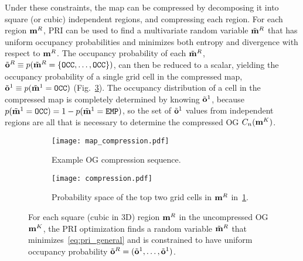 Under these constraints, the map can be compressed by decomposing it into
square (or cubic) independent regions, and compressing each region.
For each region $\mathbf{m}^{R}$, PRI can be used to find a multivariate random
variable $\tilde{\mathbf{m}}^{R}$ that has uniform occupancy probabilities and
minimizes both entropy and divergence with respect to $\mathbf{m}^{R}$.
The occupancy probability of each $\tilde{\mathbf{m}}^{R}$,
$\tilde{\mathbf{o}}^{R} \equiv
p(\tilde{\mathbf{m}}^{R}=\{\texttt{OCC},\dots,\texttt{OCC}\})$, can then be reduced
to a scalar, yielding the occupancy probability of a single grid cell in the
compressed map, $\tilde{\mathbf{o}}^{1}\equiv
p(\tilde{\mathbf{m}}^{1}=\texttt{OCC})$ (Fig.~\ref{fig:pri_compression}).
The occupancy distribution of a cell in the compressed map is completely determined by knowing
$\tilde{\mathbf{o}}^{1}$, because $p(\tilde{\mathbf{m}}^{1}=\texttt{OCC}) = 1 -
p(\tilde{\mathbf{m}}^{1} =
\texttt{EMP})$, so the set of $\tilde{\mathbf{o}}^{1}$ values from independent
regions are all that is necessary to determine the compressed OG $C_{n}(\mathbf{m}^{K})$.

\begin{figure}
  \centering
    \begin{subfigure}[t]{0.45\textwidth}
        \centering
        \texttt{[image: map\_compression.pdf]}
        \caption{Example OG compression sequence. \label{fig:pri_compression1}}
    \end{subfigure}
    \hfill
    \begin{subfigure}[t]{0.45\textwidth}
        \centering
        \texttt{[image: compression.pdf]}
        \caption{Probability space of the top two grid cells
        in $\mathbf{m}^{R}$ in~\ref{fig:pri_compression1}. \label{fig:pri_compression2}}
    \end{subfigure}
    \caption[Occupancy grid compression sequence.]{For each square (cubic in 3D)
      region $\mathbf{m}^{R}$ in the uncompressed OG $\mathbf{m}^{K}$,
      the PRI optimization finds a random variable $\tilde{\mathbf{m}}^{R}$ that
    minimizes~\eqref{eq:pri_general} and is constrained to have uniform occupancy
    probability $\tilde{\mathbf{o}}^{R} = (\tilde{\mathbf{o}}^{1}, \dots,
    \tilde{\mathbf{o}}^{1})$.
  \label{fig:pri_compression}}
\end{figure}

